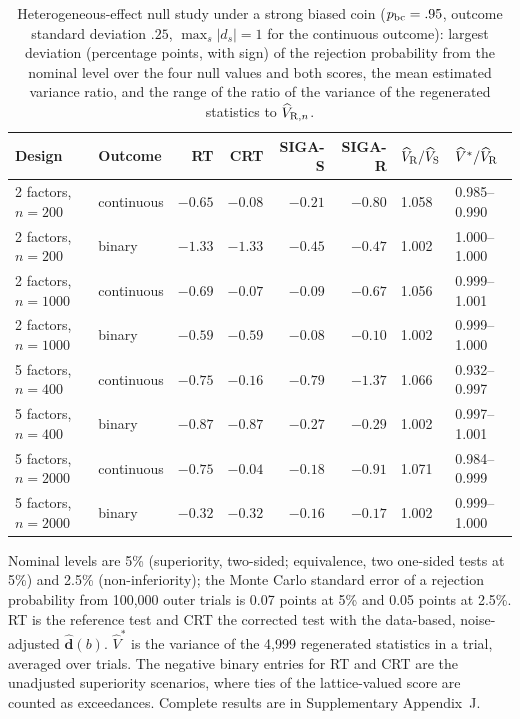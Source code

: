 \begin{table}[!htbp]
\centering
\caption{Heterogeneous-effect null study under a strong biased coin ($p_{\rm bc}=.95$, outcome standard deviation $.25$, $\max_s|d_s|=1$ for the continuous outcome): largest deviation (percentage points, with sign) of the rejection probability from the nominal level over the four null values and both scores, the mean estimated variance ratio, and the range of the ratio of the variance of the regenerated statistics to $\widehat V_{{\rm R},n}$.}
\label{tab:hetero-null-stress}
\begin{threeparttable}\begin{singlespace}\small\setlength{\tabcolsep}{4pt}
\begin{tabular}{@{}llrrrrll@{}}
\toprule
Design & Outcome & RT & CRT & SIGA-S & SIGA-R & $\widehat V_{\rm R}/\widehat V_{\rm S}$ & $\widehat V^{*}/\widehat V_{\rm R}$\\
\midrule
2 factors, $n=200$ & continuous & $-0.65$ & $-0.08$ & $-0.21$ & $-0.80$ & 1.058 & 0.985--0.990\\
2 factors, $n=200$ & binary & $-1.33$ & $-1.33$ & $-0.45$ & $-0.47$ & 1.002 & 1.000--1.000\\
2 factors, $n=1000$ & continuous & $-0.69$ & $-0.07$ & $-0.09$ & $-0.67$ & 1.056 & 0.999--1.001\\
2 factors, $n=1000$ & binary & $-0.59$ & $-0.59$ & $-0.08$ & $-0.10$ & 1.002 & 0.999--1.000\\
5 factors, $n=400$ & continuous & $-0.75$ & $-0.16$ & $-0.79$ & $-1.37$ & 1.066 & 0.932--0.997\\
5 factors, $n=400$ & binary & $-0.87$ & $-0.87$ & $-0.27$ & $-0.29$ & 1.002 & 0.997--1.001\\
5 factors, $n=2000$ & continuous & $-0.75$ & $-0.04$ & $-0.18$ & $-0.91$ & 1.071 & 0.984--0.999\\
5 factors, $n=2000$ & binary & $-0.32$ & $-0.32$ & $-0.16$ & $-0.17$ & 1.002 & 0.999--1.000\\
\bottomrule
\end{tabular}
\begin{tablenotes}[flushleft]\small
\item Nominal levels are 5\% (superiority, two-sided; equivalence, two one-sided tests at 5\%) and 2.5\% (non-inferiority); the Monte Carlo standard error of a rejection probability from 100,000 outer trials is 0.07 points at 5\% and 0.05 points at 2.5\%. RT is the reference test and CRT the corrected test with the data-based, noise-adjusted $\widehat{\bm d}(b)$. $\widehat V^{*}$ is the variance of the 4,999 regenerated statistics in a trial, averaged over trials. The negative binary entries for RT and CRT are the unadjusted superiority scenarios, where ties of the lattice-valued score are counted as exceedances. Complete results are in Supplementary Appendix~J.
\end{tablenotes}\end{singlespace}\end{threeparttable}
\end{table}
